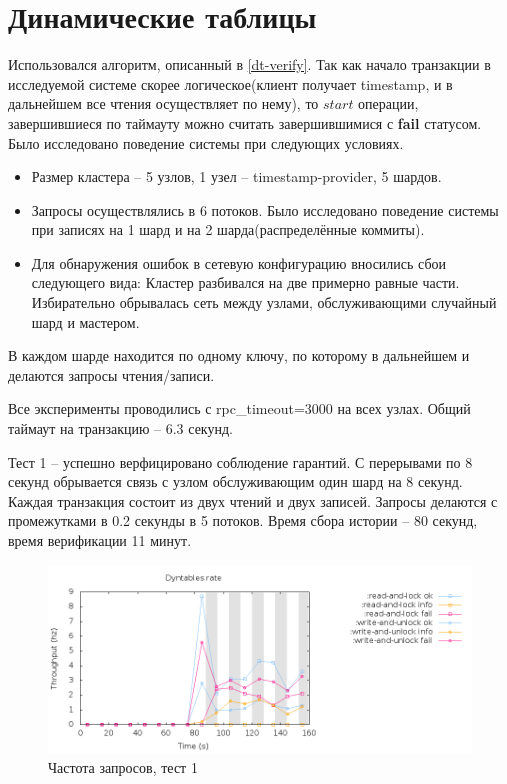 \documentclass[pdftex,ptm,14pt,a4paper]{extreport}
\theoremstyle{definition}
\begin{document}
\section{Динамические таблицы}
Использовался алгоритм, описанный в \ref{dt-verify}.
Так как начало транзакции в исследуемой системе скорее логическое(клиент получает timestamp, и в дальнейшем
все чтения осуществляет по нему), то $start$ операции, завершившиеся по таймауту можно считать завершившимися
с \textbf{fail} статусом.
Было исследовано поведение системы при следующих условиях.
\begin{itemize}
    \item Размер кластера -- 5 узлов, 1 узел -- timestamp-provider, 5 шардов.
    \item Запросы осуществлялись в 6 потоков. Было исследовано поведение системы при записях
        на 1 шард и на 2 шарда(распределённые коммиты).
    \item Для обнаружения ошибок в сетевую конфигурацию вносились сбои следующего вида:
        \subitem Кластер разбивался на две примерно равные части.
        \subitem Избирательно обрывалась сеть между узлами, обслуживающими случайный шард и мастером.
\end{itemize}

В каждом шарде находится по одному ключу, по которому в дальнейшем и делаются запросы чтения/записи.

Все эксперименты проводились с rpc\_timeout=3000 на всех узлах.
Общий таймаут на транзакцию -- 6.3 секунд.

Тест 1 -- успешно верфицировано соблюдение гарантий. С перерывами по 8 секунд
обрывается связь с узлом обслуживающим один шард на 8 секунд. Каждая транзакция состоит
из двух чтений и двух записей. Запросы делаются с промежутками в 0.2 секунды в 5 потоков.
Время сбора истории -- 80 секунд, время верификации 11 минут.

\begin{figure}[h]
    \includegraphics[scale=0.6]{dyntables-1/rate.png}
    \caption{Частота запросов, тест 1}
\end{figure}
\end{document}
